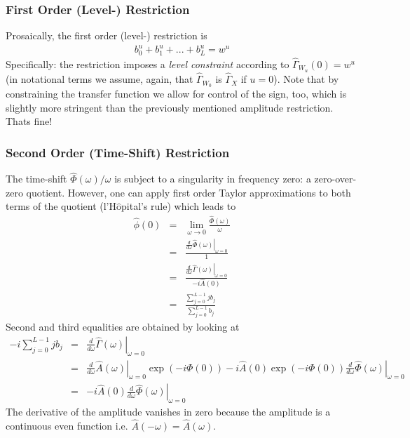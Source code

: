 \documentclass[11pt]{article}
\begin{document}
\subsubsection{First Order (Level-) Restriction}

Prosaically, the first order (level-) restriction is
\begin{eqnarray}\label{cons1}
b_0^u+b_1^u+...+b_L^u=w^u
\end{eqnarray}
Specifically: the restriction imposes a \emph{level constraint} according to  $\hat{\Gamma}_{W_u}(0)=w^u$ (in notational terms we assume, again, that $\hat{\Gamma}_{W_0}$ is $\hat{\Gamma}_{X}$ if $u=0$). Note that by constraining the transfer function we allow for control of the sign, too, which is slightly more stringent than the previously mentioned  amplitude restriction. Thats fine! 


\subsubsection{Second Order (Time-Shift) Restriction}\label{tsrnl}



The time-shift $\hat{\Phi}(\omega)/\omega$ is subject to a singularity in frequency zero: a zero-over-zero quotient.
However, one can apply
first order Taylor approximations to both terms of the quotient (l'H$\hat{\textrm{o}}$pital's rule) which leads to
\begin{eqnarray}
\hat{\phi}(0)&=&\lim_{\omega\to 0}\frac{\hat{\Phi}(\omega)}{\omega}\nonumber\\
&=&\frac{\left.\frac{d}{d\omega}\hat{\Phi}(\omega)\right |_{\omega=0}}{1}\nonumber\\
&=&\frac{\left.\frac{d}{d\omega}\hat{\Gamma}(\omega)\right|_{\omega=0}}{-i\hat{A}(0)}\nonumber\\
&=&\frac{\sum_{j=0}^{L-1}jb_j}{\sum_{j=0}^{L-1}b_j}\label{shift_zero_eq}
\end{eqnarray}
Second and third equalities are obtained by looking at
\begin{eqnarray*}
-i\sum_{j=0}^{L-1}jb_j&=&\left.\frac{d}{d\omega}\hat{\Gamma}(\omega)\right |_{\omega=0}\\
&=&\left.\frac{d}{d\omega}\hat{A}(\omega)\right |_{\omega=0}
\exp(-i\Phi(0))-i\hat{A}(0)\exp(-i\Phi(0))\left.\frac{d}{d\omega}\hat{\Phi}(\omega)\right |_{\omega=0}\\
&=&-i \hat{A}(0)\left.\frac{d}{d\omega}\hat{\Phi}(\omega)\right |_{\omega=0}
\end{eqnarray*}
The derivative of the amplitude vanishes in zero because the amplitude is a continuous even function
i.e. $\hat{A}(-\omega)=\hat{A}(\omega)$.\\
\end{document}
